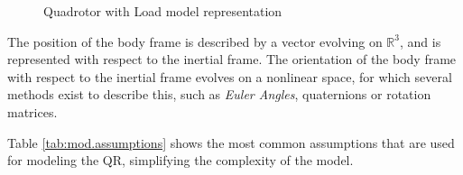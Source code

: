 \begin{figure}[h!]
	\centering
	\caption{Quadrotor with Load model representation\label{fig:mod.modelQRL}}
\end{figure}	

The position of the body frame is described by a vector evolving on $ \mathbb{R}^3 $, and is represented with respect to the inertial frame. The orientation of the body frame with respect to the inertial frame evolves on a nonlinear space, for which several methods exist to describe this, such as \textit{Euler Angles}, quaternions or rotation matrices. 

Table \ref{tab:mod.assumptions} shows the most common assumptions that are used for modeling the QR, simplifying the complexity of the model.

